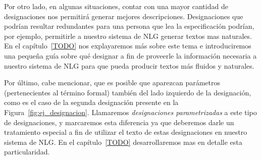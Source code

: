 Por otro lado, en algunas situaciones, contar con una mayor cantidad de designaciones nos permitirá generar mejores descripciones. Designaciones que podrían resultar redundantes para una persona que lea la especificación podrían, por ejemplo, permitirle a nuestro sistema de NLG generar textos mas naturales. En el capítulo~\ref{TODO} nos explayaremos más sobre este tema e introduciremos una pequeña guía sobre qué designar a fin de proveerle la información necesaria a nuestro sistema de NLG para que pueda producir textos más fluidos y naturales.

Por último, cabe mencionar, que es posible que aparezcan parámetros (pertenecientes al término formal) también del lado izquierdo de la designación, como es el caso de la segunda designación presente en la Figura~\ref{fig:ej_designacion}. Llamaremos \emph{designaciones parametrizadas} a este tipo de designaciones, y marcaremos esta diferencia ya que deberemos darle un tratamiento especial a fin de utilizar el texto de estas designaciones en nuestro sistema de NLG. En el capítulo~\ref{TODO} desarrollaremos mas en detalle esta particularidad. 

